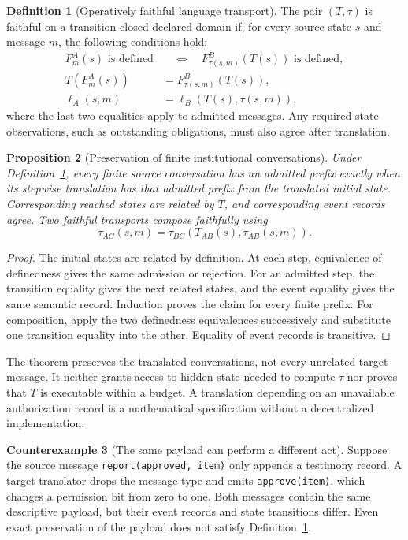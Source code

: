 \documentclass[11pt,letterpaper]{article}
\theoremstyle{plain}
\newtheorem{proposition}{Proposition}[section]
\theoremstyle{definition}
\newtheorem{definition}[proposition]{Definition}
\newtheorem{counterexample}[proposition]{Counterexample}
\theoremstyle{remark}
\newcommand{\code}[1]{\texttt{\small #1}}
\begin{document}
\begin{definition}[Operatively faithful language transport]\label{def:language}
The pair $(T,\tau)$ is faithful on a transition-closed declared domain if, for every source state $s$ and message $m$, the following conditions hold:
\begin{align*}
F^A_m(s)\text{ is defined}&\quad\Longleftrightarrow\quad
F^B_{\tau(s,m)}(T(s))\text{ is defined},\\
T(F^A_m(s))&=F^B_{\tau(s,m)}(T(s)),\\
\ell_A(s,m)&=\ell_B(T(s),\tau(s,m)),
\end{align*}
where the last two equalities apply to admitted messages. Any required state observations, such as outstanding obligations, must also agree after translation.
\end{definition}

\begin{proposition}[Preservation of finite institutional conversations]\label{prop:languagetrace}
Under Definition~\ref{def:language}, every finite source conversation has an admitted prefix exactly when its stepwise translation has that admitted prefix from the translated initial state. Corresponding reached states are related by $T$, and corresponding event records agree. Two faithful transports compose faithfully using
\[
\tau_{AC}(s,m)=\tau_{BC}(T_{AB}(s),\tau_{AB}(s,m)).
\]
\end{proposition}
\begin{proof}
The initial states are related by definition. At each step, equivalence of definedness gives the same admission or rejection. For an admitted step, the transition equality gives the next related states, and the event equality gives the same semantic record. Induction proves the claim for every finite prefix. For composition, apply the two definedness equivalences successively and substitute one transition equality into the other. Equality of event records is transitive.
\end{proof}

The theorem preserves the translated conversations, not every unrelated target message. It neither grants access to hidden state needed to compute $\tau$ nor proves that $T$ is executable within a budget. A translation depending on an unavailable authorization record is a mathematical specification without a decentralized implementation.

\begin{counterexample}[The same payload can perform a different act]\label{ex:speechact}
Suppose the source message \code{report(approved, item)} only appends a testimony record. A target translator drops the message type and emits \code{approve(item)}, which changes a permission bit from zero to one. Both messages contain the same descriptive payload, but their event records and state transitions differ. Even exact preservation of the payload does not satisfy Definition~\ref{def:language}.
\end{counterexample}
\end{document}
